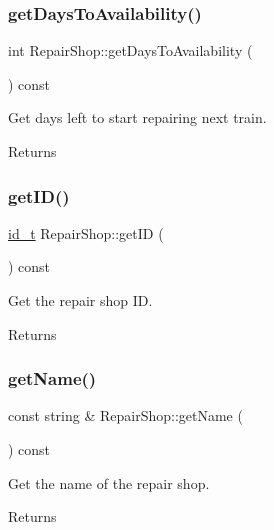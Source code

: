 \subsubsection{\texorpdfstring{get\+Days\+To\+Availability()}{getDaysToAvailability()}}
{\footnotesize\ttfamily int Repair\+Shop\+::get\+Days\+To\+Availability (\begin{DoxyParamCaption}{ }\end{DoxyParamCaption}) const}

Get days left to start repairing next train.

\begin{DoxyReturn}{Returns}

\end{DoxyReturn}
\mbox{\label{classRepairShop_a78f871f65f7bf4b0f068b9406998f351}} 
\subsubsection{\texorpdfstring{get\+I\+D()}{getID()}}
{\footnotesize\ttfamily \mbox{\hyperlink{project__utils_8h_a8f3a969054ad2200720b96e7e23dd4e1}{id\+\_\+t}} Repair\+Shop\+::get\+ID (\begin{DoxyParamCaption}{ }\end{DoxyParamCaption}) const}

Get the repair shop ID. \begin{DoxyReturn}{Returns}

\end{DoxyReturn}
\mbox{\label{classRepairShop_ae470c339746dcb9ba5bb4c58195e0400}} 
\subsubsection{\texorpdfstring{get\+Name()}{getName()}}
{\footnotesize\ttfamily const string \& Repair\+Shop\+::get\+Name (\begin{DoxyParamCaption}{ }\end{DoxyParamCaption}) const}

Get the name of the repair shop.

\begin{DoxyReturn}{Returns}

\end{DoxyReturn}
\mbox{\label{classRepairShop_a5a1fe514136f22f66e8676421525c896}} 
